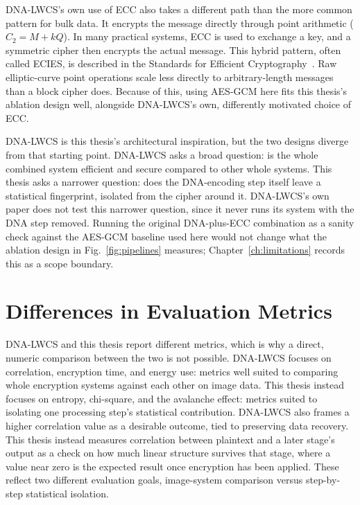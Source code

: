 \documentclass[12pt,a4paper,twoside]{report}
\numberwithin{equation}{chapter}
\begin{document}
DNA-LWCS's own use of ECC also takes a different path than the more
common pattern for bulk data. It encrypts the message directly through
point arithmetic ($C_2 = M + kQ$). In many practical systems, ECC is
used to exchange a key, and a symmetric cipher then encrypts the actual
message. This hybrid pattern, often called ECIES, is described in the
Standards for Efficient Cryptography~\cite{sec1}. Raw elliptic-curve
point operations scale less directly to arbitrary-length messages than
a block cipher does. Because of this, using AES-GCM here fits this
thesis's ablation design well, alongside DNA-LWCS's own, differently
motivated choice of ECC.

DNA-LWCS is this thesis's architectural inspiration, but the two designs
diverge from that starting point. DNA-LWCS asks a broad
question: is the whole combined system efficient and secure compared to
other whole systems. This thesis asks a narrower question: does the
DNA-encoding step itself leave a statistical fingerprint, isolated from
the cipher around it. DNA-LWCS's own paper does not test this narrower
question, since it never runs its system with the DNA step removed.
Running the original DNA-plus-ECC combination as a sanity check against
the AES-GCM baseline used here would not change what the ablation design
in Fig.~\ref{fig:pipelines} measures; Chapter~\ref{ch:limitations}
records this as a scope boundary.

\section{Differences in Evaluation Metrics}
DNA-LWCS and this thesis report different metrics, which is why a
direct, numeric comparison between the two is not possible. DNA-LWCS
focuses on correlation, encryption time, and energy use: metrics well
suited to comparing whole encryption systems against each other on
image data. This thesis instead focuses on entropy, chi-square, and the
avalanche effect: metrics suited to isolating one processing step's statistical contribution. DNA-LWCS also frames a higher correlation
value as a desirable outcome, tied to preserving data recovery. This
thesis instead measures correlation between plaintext and a later
stage's output as a check on how much linear structure survives that
stage, where a value near zero is the expected result once encryption
has been applied. These reflect two different evaluation goals, image-system
comparison versus step-by-step statistical isolation.

\end{document}
